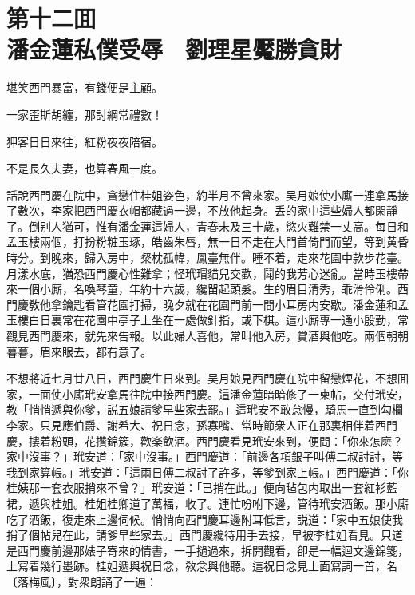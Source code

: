 
\chapter*{第十二囬　\\潘金蓮私僕受辱　劉理星魘勝貪財}


\begin{myquote}
堪笑西門暴富，有錢便是主顧。

一家歪斯胡纏，那討綱常禮數！

狎客日日來往，紅粉夜夜陪宿。

不是長久夫妻，也算春風一度。
\end{myquote}

話說西門慶在院中，貪戀住桂姐姿色，約半月不曾來家。吴月娘使小廝一連拿馬接了數次，李家把西門慶衣帽都藏過一邊，不放他起身。丢的家中這些婦人都閑靜了。倒别人猶可，惟有潘金蓮這婦人，青春未及三十歲，慾火難禁一丈高。每日和孟玉樓兩個，打扮粉粧玉琢，皓齒朱唇，無一日不走在大門首倚門而望，等到黄昏時分。到晚來，歸入房中，粲枕孤幃，鳳臺無伴。睡不着，走來花園中款步花臺。月漾水底，猶恐西門慶心性難拿；怪玳瑁貓兒交歡，鬦的我芳心迷亂。當時玉樓帶來一個小廝，名喚琴童，年約十六歲，纔㽞起頭髮。生的眉目清秀，乖滑伶俐。西門慶敎他拿鑰匙看管花園打掃，晚夕就在花園門前一間小耳房内安歇。潘金蓮和孟玉樓白日裏常在花園中亭子上坐在一處做針指，或下棋。這小廝專一通小殷勤，常觀見西門慶來，就先來告報。以此婦人喜他，常叫他入房，賞酒與他吃。兩個朝朝暮暮，眉來眼去，都有意了。

不想將近七月廿八日，西門慶生日來到。吴月娘見西門慶在院中留戀煙花，不想囬家，一面使小廝玳安拿馬往院中接西門慶。這潘金蓮暗暗修了一柬帖，交付玳安，教「悄悄遞與你爹，説五娘請爹早些家去罷。」這玳安不敢怠慢，騎馬一直到勾欄李家。只見應伯爵、謝希大、祝日念，孫寡嘴、常時節衆人正在那裏相伴着西門慶，摟着粉頭，花攢錦簇，歡楽飲酒。西門慶看見玳安來到，便問：「你來怎麽？家中沒事？」玳安道：「家中沒事。」西門慶道：「前邊各項銀子叫傅二叔討討，等我到家算帳。」玳安道：「這兩日傅二叔討了許多，等爹到家上帳。」西門慶道：「你桂姨那一套衣服捎來不曾？」玳安道：「已捎在此。」便向毡包内取出一套紅衫藍裙，遞與桂姐。桂姐桂卿道了萬福，收了。連忙吩咐下邊，管待玳安酒飯。那小廝吃了酒飯，復走來上邊伺候。悄悄向西門慶耳邊附耳低言，説道：「家中五娘使我捎了個帖兒在此，請爹早些家去。」西門慶纔待用手去接，早被李桂姐看見。只道是西門慶前邊那婊子寄來的情書，一手撾過來，拆開觀看，卻是一幅迴文邊錦箋，上寫着幾行墨跡。桂姐遞與祝日念，敎念與他聽。這祝日念見上面寫詞一首，名〔落梅風〕，對衆朗誦了一遍：

